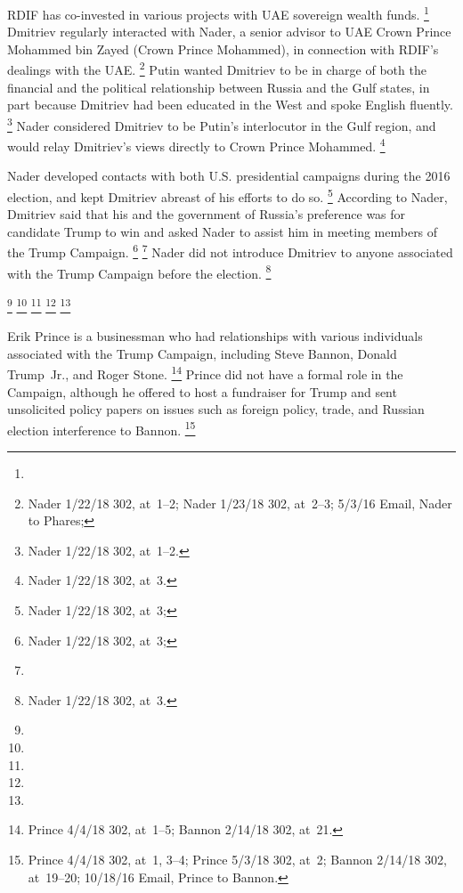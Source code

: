RDIF has co-invested in various projects with UAE sovereign wealth funds.%
\footnote{}
Dmitriev regularly interacted with Nader, a senior advisor to UAE Crown Prince Mohammed bin Zayed (Crown Prince Mohammed), in connection with RDIF's dealings with the UAE\null.%
\footnote{Nader 1/22/18 302, at~1--2;
Nader 1/23/18 302, at~2--3;
5/3/16 Email, Nader to Phares;
}
Putin wanted Dmitriev to be in charge of both the financial and the political relationship between Russia and the Gulf states, in part because Dmitriev had been educated in the West and spoke English fluently.%
\footnote{Nader 1/22/18 302, at~1--2.}
Nader considered Dmitriev to be Putin's interlocutor in the Gulf region, and would relay Dmitriev's views directly to Crown Prince Mohammed.%
\footnote{Nader 1/22/18 302, at~3.}

Nader developed contacts with both U.S. presidential campaigns during the 2016 election, and kept Dmitriev abreast of his efforts to do so.%
\footnote{Nader 1/22/18 302, at~3; }
According to Nader, Dmitriev said that his and the government of Russia's preference was for candidate Trump to win and asked Nader to assist him in meeting members of the Trump Campaign.%
\footnote{Nader 1/22/18 302, at~3; }
\footnote{}
Nader did not introduce Dmitriev to anyone associated with the Trump Campaign before the election.%
\footnote{Nader 1/22/18 302, at~3.}

\footnote{}
\footnote{}
\footnote{}
\footnote{}
\footnote{}

Erik Prince is a businessman who had relationships with various individuals associated with the Trump Campaign, including Steve Bannon, Donald Trump~Jr., and Roger Stone.%
\footnote{Prince 4/4/18 302, at~1--5;
Bannon 2/14/18 302, at~21.}
Prince did not have a formal role in the Campaign, although he offered to host a fundraiser for Trump and sent unsolicited policy papers on issues such as foreign policy, trade, and Russian election interference to Bannon.%
\footnote{Prince 4/4/18 302, at~1, 3--4;
Prince 5/3/18 302, at~2;
Bannon 2/14/18 302, at~19--20;
10/18/16 Email, Prince to Bannon.}

